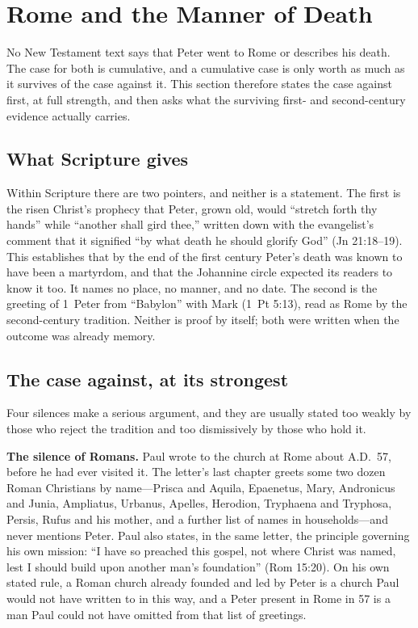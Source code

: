 \section{Rome and the Manner of Death}

No New Testament text says that Peter went to Rome or describes his death.
The case for both is cumulative, and a cumulative case is only worth as much
as it survives of the case against it. This section therefore states the case
against first, at full strength, and then asks what the surviving first- and
second-century evidence actually carries.

\subsection{What Scripture gives}

Within Scripture there are two pointers, and neither is a statement. The
first is the risen Christ's prophecy that Peter, grown old, would ``stretch
forth thy hands'' while ``another shall gird thee,'' written down with the
evangelist's comment that it signified ``by what death he should glorify
God'' (Jn 21:18--19). This establishes that by the end of the first century
Peter's death was known to have been a martyrdom, and that the Johannine
circle expected its readers to know it too. It names no place, no manner, and
no date. The second is the greeting of 1~Peter from ``Babylon'' with Mark
(1~Pt 5:13), read as Rome by the second-century tradition. Neither is proof
by itself; both were written when the outcome was already memory.

\subsection{The case against, at its strongest}

Four silences make a serious argument, and they are usually stated too
weakly by those who reject the tradition and too dismissively by those who
hold it.

\textbf{The silence of Romans.} Paul wrote to the church at Rome about
A.D.~57, before he had ever visited it. The letter's last chapter greets some
two dozen Roman Christians by name---Prisca and Aquila, Epaenetus, Mary,
Andronicus and Junia, Ampliatus, Urbanus, Apelles, Herodion, Tryphaena and
Tryphosa, Persis, Rufus and his mother, and a further list of names in
households---and never mentions Peter. Paul also states, in the same letter,
the principle governing his own mission: ``I have so preached this gospel,
not where Christ was named, lest I should build upon another man's
foundation'' (Rom 15:20). On his own stated rule, a Roman church already
founded and led by Peter is a church Paul would not have written to in this
way, and a Peter present in Rome in 57 is a man Paul could not have omitted
from that list of greetings.

